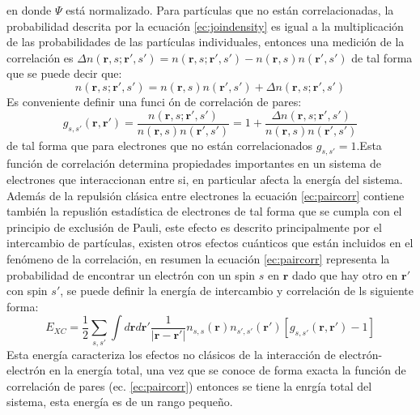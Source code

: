 \documentclass[12pt,a4paper, oneside]{book}
\begin{document}
  en donde $\Psi$ est\'a normalizado. Para part\'iculas que no est\'an correlacionadas, la probabilidad descrita por la ecuaci\'on \ref{ec:joindensity} es igual a la multiplicaci\'on de las probabilidades de las part\'iculas individuales, entonces una medici\'on de la correlaci\'on es $\Delta n(\pmb{r},s; \pmb{r'},s' )= n(\pmb{r},s; \pmb{r'},s' ) -n(\pmb{r},s) n( \pmb{r'},s' )$ de tal forma que se puede decir que:
  \begin{equation}
  n(\pmb{r},s; \pmb{r'},s' )= n(\pmb{r},s) n( \pmb{r'},s' ) + \Delta n(\pmb{r},s; \pmb{r'},s' ) \label{ec:def2joinprob} 
  \end{equation}
  Es conveniente definir una funci \'on de correlaci\'on de pares:
  \begin{equation}
  g_{s,s'} (\pmb{r},\pmb{r'})= \frac{n(\pmb{r},s; \pmb{r'},s' )}{n(\pmb{r},s) n( \pmb{r'},s' )} = 1+ \frac{\Delta n(\pmb{r},s; \pmb{r'},s' )}{n(\pmb{r},s) n( \pmb{r'},s' )} \label{ec:paircorr}
  \end{equation} 
  de tal forma que para electrones que no est\'an correlacionados $g_{s,s'}=1$.Esta funci\'on de correlaci\'on determina propiedades importantes en un sistema de electrones que interaccionan entre si, en particular afecta la energ\'ia del sistema. Adem\'as de la repulsi\'on cl\'asica entre electrones la ecuaci\'on \ref{ec:paircorr} contiene tambi\'en la repusli\'on estad\'istica de electrones de tal forma que se cumpla con el principio de exclusi\'on de Pauli, este efecto es descrito principalmente por el intercambio de part\'iculas, existen otros efectos cu\'anticos que est\'an incluidos en el fen\'omeno de la correlaci\'on, en resumen la ecuaci\'on \ref{ec:paircorr} representa la probabilidad de encontrar un electr\'on con un spin $s$ en $\pmb{r}$ dado que hay otro en  $\pmb{r'}$ con spin $s'$, se puede definir la energ\'ia de intercambio y correlaci\'on de ls siguiente forma:
  \begin{equation}
  E_{XC} = \frac{1}{2} \sum_{s,s '} \int d \pmb{r} d \pmb{r'} \frac{1}{|\pmb{r}- \pmb{r'}|} n_{s,s} (\pmb{r}) n_{s',s'} (\pmb{r'}) [g_{s,s'} (\pmb{r}, \pmb{r'})-1] \label{ec:energiaXC}
  \end{equation} 
  Esta energ\'ia caracteriza los efectos no cl\'asicos de la interacci\'on de electr\'on-electr\'on en la energ\'ia total, una vez que se conoce de forma exacta  la funci\'on de correlaci\'on de pares (ec. \ref{ec:paircorr}) entonces se tiene la enrg\'ia total del sistema, esta energ\'ia es de un rango peque\~no.
\end{document}
